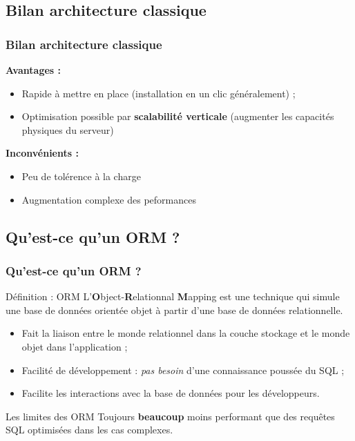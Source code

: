     \subsection{Bilan architecture classique}
    \begin{frame}
        \frametitle{Bilan architecture classique}

        \textbf{Avantages :}
        \begin{itemize}
            \item Rapide à mettre en place (installation en un clic généralement) ;
            \item Optimisation possible par \textbf{scalabilité verticale} (augmenter les capacités physiques du serveur)
        \end{itemize}

        \vspace{20px}

        \textbf{Inconvénients :}
        \begin{itemize}
            \item Peu de tolérence à la charge
            \item Augmentation complexe des peformances
        \end{itemize}
    \end{frame}

    \subsection{Qu'est-ce qu'un ORM ?}
    \begin{frame}
        \frametitle{Qu'est-ce qu'un ORM ?}

        \begin{block}{Définition : ORM}
            L'\textbf{O}bject-\textbf{R}elationnal \textbf{M}apping est une technique qui simule une base de données orientée objet à partir d'une base de données relationnelle.
        \end{block}

        \begin{itemize}
            \footnotesize
            \item Fait la liaison entre le monde relationnel dans la couche stockage et le monde objet dans l'application ;
            \item Facilité de développement : \textit{pas besoin} d'une connaissance poussée du SQL ;
            \item Facilite les interactions avec la base de données pour les développeurs.
        \end{itemize}

        \begin{alertblock}{Les limites des ORM}
            Toujours \textbf{beaucoup} moins performant que des requêtes SQL optimisées dans les cas complexes.
        \end{alertblock}
    \end{frame}


